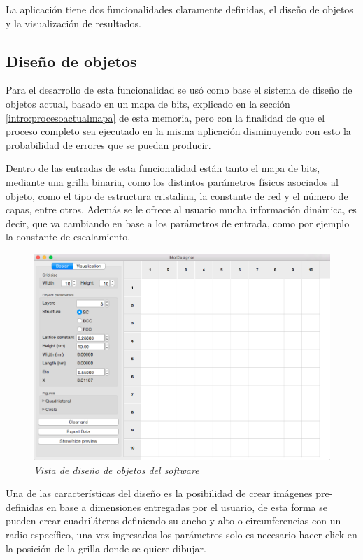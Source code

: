La aplicación tiene dos funcionalidades claramente definidas, el diseño de objetos y la visualización de resultados.

\subsection{Diseño de objetos}

Para el desarrollo de esta funcionalidad se usó como base el sistema de diseño de objetos actual, basado en un mapa de bits, explicado en la sección \ref{intro:procesoactualmapa} de esta memoria, pero con la finalidad de que el proceso completo sea ejecutado en la misma aplicación disminuyendo con esto la probabilidad de errores que se puedan producir.

Dentro de las entradas de esta funcionalidad están tanto el mapa de bits, mediante una grilla binaria, como los distintos parámetros físicos asociados al objeto, como el tipo de estructura cristalina, la constante de red y el número de capas, entre otros. Además se le ofrece al usuario mucha información dinámica, es decir, que va cambiando en base a los parámetros de entrada, como por ejemplo la constante de escalamiento.

\begin{figure}[H]
  \centering
  \includegraphics[scale=.45]{images/softwareDiseno}
  \caption{\em Vista de diseño de objetos del software}
\end{figure}

Una de las características del diseño es la posibilidad de crear imágenes pre-definidas en base a dimensiones entregadas por el usuario, de esta forma se pueden crear cuadriláteros definiendo su ancho y alto o circunferencias con un radio específico, una vez ingresados los parámetros solo es necesario hacer click en la posición de la grilla donde se quiere dibujar.

